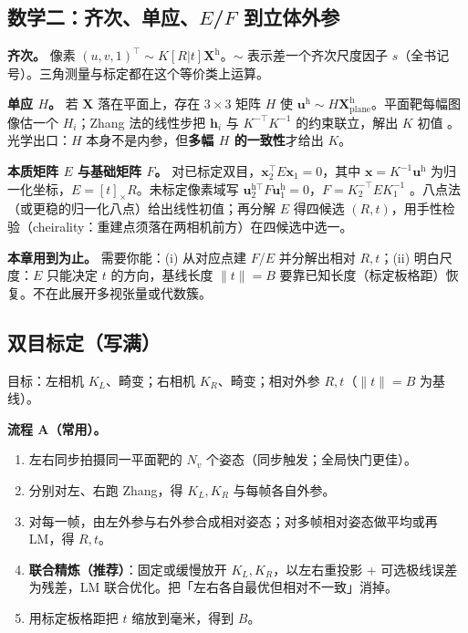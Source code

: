 \subsection{数学二：齐次、单应、$E$/$F$ 到立体外参}
\label{sec:ch03-homography}

\textbf{齐次。} 像素 $(u,v,1)^\top\sim K[R|t]\boldsymbol X^{\mathrm{h}}$。$\sim$ 表示差一个齐次尺度因子 $s$（全书记号）。三角测量与标定都在这个等价类上运算。

\textbf{单应 $H$。} 若 $\boldsymbol X$ 落在平面上，存在 $3\times3$ 矩阵 $H$ 使 $\boldsymbol u^{\mathrm{h}}\sim H\boldsymbol X_{\mathrm{plane}}^{\mathrm{h}}$。平面靶每幅图像估一个 $H_i$；Zhang 法的线性步把 $\boldsymbol h_i$ 与 $K^{-\top}K^{-1}$ 的约束联立，解出 $K$ 初值 \citep{Zhang2000Calibration}。光学出口：$H$ 本身不是内参，但\textbf{多幅 $H$ 的一致性}才给出 $K$。

\textbf{本质矩阵 $E$ 与基础矩阵 $F$。} 对已标定双目，$\boldsymbol x_2^\top E\boldsymbol x_1=0$，其中 $\boldsymbol x=K^{-1}\boldsymbol u^{\mathrm{h}}$ 为归一化坐标，$E=[t]_\times R$。未标定像素域写 $\boldsymbol u_2^{\mathrm{h}\top} F\boldsymbol u_1^{\mathrm{h}}=0$，$F=K_2^{-\top}EK_1^{-1}$ \citep{HartleyZisserman2004}。八点法（或更稳的归一化八点）给出线性初值；再分解 $E$ 得四候选 $(R,t)$，用手性检验（cheirality：重建点须落在两相机前方）在四候选中选一。

\textbf{本章用到为止。} 需要你能：(i) 从对应点建 $F$/$E$ 并分解出相对 $R,t$；(ii) 明白尺度：$E$ 只能决定 $t$ 的方向，基线长度 $\|t\|=B$ 要靠已知长度（标定板格距）恢复。不在此展开多视张量或代数簇。

\subsection{双目标定（写满）}

目标：左相机 $K_L$、畸变；右相机 $K_R$、畸变；相对外参 $R,t$（$\|t\|=B$ 为基线）。

\textbf{流程 A（常用）。}
\begin{enumerate}
  \item 左右同步拍摄同一平面靶的 $N_v$ 个姿态（同步触发；全局快门更佳）。
  \item 分别对左、右跑 Zhang，得 $K_L,K_R$ 与每帧各自外参。
  \item 对每一帧，由左外参与右外参合成相对姿态；对多帧相对姿态做平均或再 LM，得 $R,t$。
  \item \textbf{联合精炼（推荐）}：固定或缓慢放开 $K_L,K_R$，以左右重投影 + 可选极线误差为残差，LM 联合优化。把「左右各自最优但相对不一致」消掉。
  \item 用标定板格距把 $t$ 缩放到毫米，得到 $B$。
\end{enumerate}


